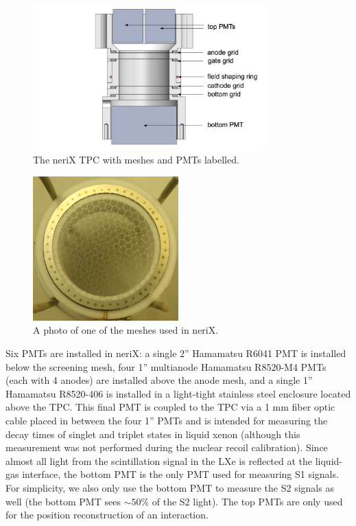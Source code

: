 \begin{figure}[t]
        \centering
	\includegraphics[width=0.8\textwidth]{nerix_tpc_labeled}
	\caption{The neriX TPC with meshes and PMTs labelled.}
	\label{fig:nerix_tpc_labeled}
\end{figure}
   
   
\begin{figure}[bt]
        \centering
	\includegraphics[width=0.5\textwidth]{nerix_tpc_mesh}
	\caption{A photo of one of the meshes used in neriX.}
	\label{fig:nerix_tpc_mesh}
\end{figure}



Six PMTs are installed in neriX: a single 2'' Hamamatsu R6041 PMT is installed below the screening mesh, four 1'' multianode Hamamatsu R8520-M4 PMTs (each with 4 anodes) are installed above the anode mesh, and a single 1'' Hamamatsu R8520-406 is installed in a light-tight stainless steel enclosure located above the TPC.  This final PMT is coupled to the TPC via a 1 mm fiber optic cable placed in between the four 1'' PMTs and is intended for measuring the decay times of singlet and triplet states in liquid xenon (although this measurement was not performed during the nuclear recoil calibration).  Since almost all light from the scintillation signal in the LXe is reflected at the liquid-gas interface, the bottom PMT is the only PMT used for measuring S1 signals.  For simplicity, we also only use the bottom PMT to measure the S2 signals as well (the bottom PMT sees $\sim 50\%$ of the S2 light).  The top PMTs are only used for the position reconstruction of an interaction.

